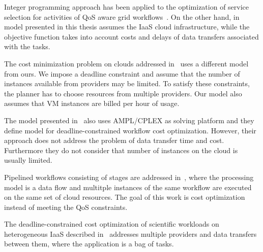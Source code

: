 Integer programming approach has been applied to the optimization of service selection for activities of QoS aware grid workflows~\cite{Brandic08}. On the other hand, in model presented in this thesis assumes the IaaS cloud infrastructure, while the objective function takes into account costs and delays of data transfers associated with the tasks.

The cost minimization problem on clouds addressed in~\cite{Pandey2010} uses a different model from ours. We impose a deadline constraint and assume that the number of instances available from providers may be limited. To satisfy these constraints, the planner has to choose resources from multiple providers. Our model also assumes that VM instances are billed per hour of usage.

The model presented in~\cite{Genez2012} also uses AMPL/CPLEX as solving platform and they define model for deadline-constrained workflow cost optimization. However, their approach does not address the problem of data transfer time and cost. Furthermore they do not consider that number of instances on the cloud is usually limited. 

Pipelined workflows consisting of stages are addressed in~\cite{TolosanaCalasanz20121300}, where the processing model is a data flow and multitple instances of the same workflow are executed on the same set of cloud resources. The goal of this work is cost optimization instead of meeting the QoS constraints.

The deadline-constrained cost optimization of scientific workloads on heterogeneous IaaS described in~\cite{VandenBossche2013973} addresses multiple providers and data transfers between them, where the application is a bag of tasks.
